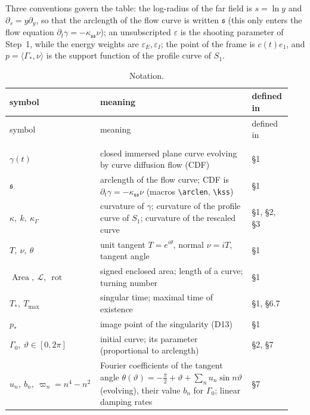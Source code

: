 Three conventions govern the table: the log-radius of the far field is $s=\ln y$ and $\partial_s=y\partial_y$, so that the arclength of the flow curve is written $\mathfrak s$ (this only enters the flow equation $\partial_t\gamma=-\kappa_{\mathfrak{ss}}\nu$); an unsubscripted $\varepsilon$ is the shooting parameter of Step~1, while the energy weights are $\varepsilon_E,\varepsilon_I$; the point of the frame is $c(t)e_1$, and $p=\langle\Gamma_{\!*},\nu\rangle$ is the support function of the profile curve of $S_1$.

\begingroup\small
\begin{longtable}{@{}>{\raggedright\arraybackslash}p{0.27\linewidth}>{\raggedright\arraybackslash}p{0.53\linewidth}>{\raggedright\arraybackslash}p{0.14\linewidth}@{}}
\caption{Notation.}\label{pA:tab-notation}\\
\toprule symbol & meaning & defined in\\\midrule\endfirsthead
\toprule symbol & meaning & defined in\\\midrule\endhead
\bottomrule\endfoot
\multicolumn{3}{@{}l}{\textit{Flow and curves}}\\
$\gamma(t)$ & closed immersed plane curve evolving by curve diffusion flow (CDF) & \S1\\
$\mathfrak s$ & arclength of the flow curve; CDF is $\partial_t\gamma=-\kappa_{\mathfrak{ss}}\nu$ (macros \texttt{\textbackslash arclen}, \texttt{\textbackslash kss}) & \S1\\
$\kappa,\ k,\ \kappa_\Gamma$ & curvature of $\gamma$; curvature of the profile curve of $S_1$; curvature of the rescaled curve & \S1, \S2, \S3\\
$T,\ \nu,\ \theta$ & unit tangent $T=e^{i\theta}$, normal $\nu=iT$, tangent angle & \S1\\
$\operatorname{Area},\ \mathcal L,\ \operatorname{rot}$ & signed enclosed area; length of a curve; turning number & \S1\\
$T_*,\ T_{\max}$ & singular time; maximal time of existence & \S1, \S6.7\\
$p_*$ & image point of the singularity (D13) & \S1\\
$\Gamma_0,\ \vartheta\in[0,2\pi]$ & initial curve; its parameter (proportional to arclength) & \S2, \S7\\
$u_n,\ b_n,\ \varpi_n=n^4-n^2$ & Fourier coefficients of the tangent angle $\theta(\vartheta)=-\frac\pi2+\vartheta+\sum_nu_n\sin n\vartheta$ (evolving), their value $b_n$ for $\Gamma_0$; linear damping rates & \S7\\

\end{longtable}
